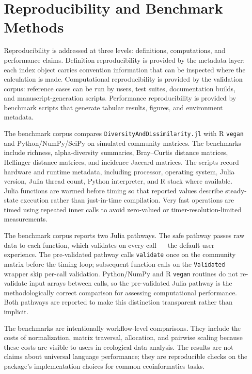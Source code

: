 \documentclass[preprint,12pt,authoryear]{elsarticle}
\begin{document}
\section{Reproducibility and Benchmark Methods}

Reproducibility is addressed at three levels: definitions, computations, and
performance claims.  Definition reproducibility is provided by the metadata
layer: each index object carries convention information that can be inspected
where the calculation is made.  Computational reproducibility is provided by
the validation corpus: reference cases can be run by users, test suites,
documentation builds, and manuscript-generation scripts.  Performance
reproducibility is provided by benchmark scripts that generate tabular
results, figures, and environment metadata.

The benchmark corpus compares \texttt{DiversityAndDissimilarity.jl} with R
\texttt{vegan} and Python/NumPy/SciPy on simulated community matrices.  The
benchmarks include richness, alpha-diversity summaries, Bray--Curtis distance
matrices, Hellinger distance matrices, and incidence Jaccard matrices.  The
scripts record hardware and runtime metadata, including processor, operating
system, Julia version, Julia thread count, Python interpreter, and R stack
where available.  Julia functions are warmed before timing so that reported
values describe steady-state execution rather than just-in-time compilation.
Very fast operations are timed using repeated inner calls to avoid
zero-valued or timer-resolution-limited measurements.

The benchmark corpus reports two Julia pathways.  The safe pathway passes raw
data to each function, which validates on every call --- the default user
experience.  The pre-validated pathway calls \texttt{validate} once on the
community matrix before the timing loop; subsequent function calls on the
\texttt{Validated} wrapper skip per-call validation.  Python/NumPy and R
\texttt{vegan} routines do not re-validate input arrays between calls, so the
pre-validated Julia pathway is the methodologically correct comparison for
assessing computational performance.  Both pathways are reported to make this
distinction transparent rather than implicit.

The benchmarks are intentionally workflow-level comparisons.  They include
the costs of normalization, matrix traversal, allocation, and pairwise scaling
because these costs are visible to users in ecological data analysis.  The
results are not claims about universal language performance; they are
reproducible checks on the package's implementation choices for common
ecoinformatics tasks.
\end{document}
